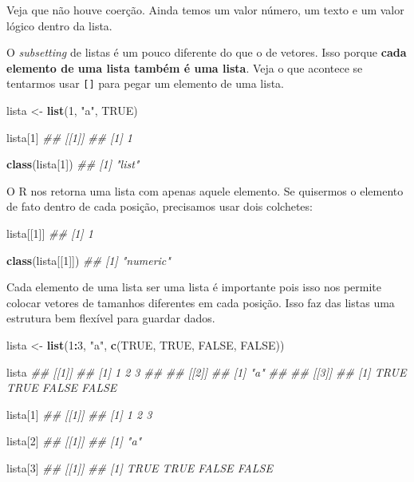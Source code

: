 \documentclass[]{book}
\newenvironment{Shaded}{\begin{snugshade}}{\end{snugshade}}
\newcommand{\CommentTok}[1]{\textcolor[rgb]{0.56,0.35,0.01}{\textit{#1}}}
\newcommand{\DecValTok}[1]{\textcolor[rgb]{0.00,0.00,0.81}{#1}}
\newcommand{\KeywordTok}[1]{\textcolor[rgb]{0.13,0.29,0.53}{\textbf{#1}}}
\newcommand{\NormalTok}[1]{#1}
\newcommand{\OperatorTok}[1]{\textcolor[rgb]{0.81,0.36,0.00}{\textbf{#1}}}
\newcommand{\OtherTok}[1]{\textcolor[rgb]{0.56,0.35,0.01}{#1}}
\newcommand{\StringTok}[1]{\textcolor[rgb]{0.31,0.60,0.02}{#1}}
\begin{document}
Veja que não houve coerção. Ainda temos um valor número, um texto e um valor lógico dentro da lista.

O \emph{subsetting} de listas é um pouco diferente do que o de vetores. Isso porque \textbf{cada elemento de uma lista também é uma lista}. Veja o que acontece se tentarmos usar \texttt{{[}{]}} para pegar um elemento de uma lista.

\begin{Shaded}
\begin{Highlighting}[]
\NormalTok{lista <-}\StringTok{ }\KeywordTok{list}\NormalTok{(}\DecValTok{1}\NormalTok{, }\StringTok{"a"}\NormalTok{, }\OtherTok{TRUE}\NormalTok{)}

\NormalTok{lista[}\DecValTok{1}\NormalTok{]}
\CommentTok{## [[1]]}
\CommentTok{## [1] 1}

\KeywordTok{class}\NormalTok{(lista[}\DecValTok{1}\NormalTok{])}
\CommentTok{## [1] "list"}
\end{Highlighting}
\end{Shaded}

O R nos retorna uma lista com apenas aquele elemento. Se quisermos o elemento de fato dentro de cada posição, precisamos usar dois colchetes:

\begin{Shaded}
\begin{Highlighting}[]
\NormalTok{lista[[}\DecValTok{1}\NormalTok{]]}
\CommentTok{## [1] 1}

\KeywordTok{class}\NormalTok{(lista[[}\DecValTok{1}\NormalTok{]])}
\CommentTok{## [1] "numeric"}
\end{Highlighting}
\end{Shaded}

Cada elemento de uma lista ser uma lista é importante pois isso nos permite colocar vetores de tamanhos diferentes em cada posição. Isso faz das listas uma estrutura bem flexível para guardar dados.

\begin{Shaded}
\begin{Highlighting}[]
\NormalTok{lista <-}\StringTok{ }\KeywordTok{list}\NormalTok{(}\DecValTok{1}\OperatorTok{:}\DecValTok{3}\NormalTok{, }\StringTok{"a"}\NormalTok{, }\KeywordTok{c}\NormalTok{(}\OtherTok{TRUE}\NormalTok{, }\OtherTok{TRUE}\NormalTok{, }\OtherTok{FALSE}\NormalTok{, }\OtherTok{FALSE}\NormalTok{))}

\NormalTok{lista}
\CommentTok{## [[1]]}
\CommentTok{## [1] 1 2 3}
\CommentTok{## }
\CommentTok{## [[2]]}
\CommentTok{## [1] "a"}
\CommentTok{## }
\CommentTok{## [[3]]}
\CommentTok{## [1]  TRUE  TRUE FALSE FALSE}

\NormalTok{lista[}\DecValTok{1}\NormalTok{]}
\CommentTok{## [[1]]}
\CommentTok{## [1] 1 2 3}

\NormalTok{lista[}\DecValTok{2}\NormalTok{]}
\CommentTok{## [[1]]}
\CommentTok{## [1] "a"}

\NormalTok{lista[}\DecValTok{3}\NormalTok{]}
\CommentTok{## [[1]]}
\CommentTok{## [1]  TRUE  TRUE FALSE FALSE}
\end{Highlighting}
\end{Shaded}
\end{document}
